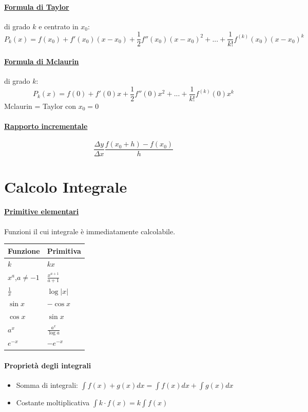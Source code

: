 \documentclass[12pt, a4paper]{article}
\begin{document}
\paragraph*{\underline{Formula di Taylor}} di grado $k$ e centrato in $x_0$:
$$P_k(x)=f(x_0)+f'(x_0)(x-x_0) + \frac{1}{2}f''(x_0)(x-x_0)^2 +... + \frac{1}{k!}f^{(k)}(x_0)(x-x_0)^k$$

\paragraph*{\underline{Formula di Mclaurin}} di grado $k$:
$$P_k(x)=f(0)+f'(0)x+\frac{1}{2}f''(0)x^2+...+\frac{1}{k!}f^{(k)}(0)x^k$$
\small{Mclaurin = Taylor con $x_0=0$}

\paragraph*{\underline{Rapporto incrementale}}
$$\frac{\Delta y}{ \Delta x}\frac{f(x_0+h)-f(x_0)}{h} $$


\section*{Calcolo Integrale}

\begin{multicols}{3}
\paragraph*{\underline{Primitive elementari}}
Funzioni il cui integrale è immediatamente calcolabile.
\columnbreak
\begin{tabularx}{0.7\textwidth}{ |Y|Y| }
	\hline
	\textbf{Funzione} & \textbf{Primitiva}    \\
	\hline
	$k$               & $kx$                  \\
	$x^a$,$a\neq-1$   & $\frac{x^{a+1}}{a+1}$ \\
	$\frac{1}{x}$     & $\log|x|$             \\
	$\sin x$          & $-\cos x$             \\
	$\cos x $         & $\sin x$              \\
	$a^x$             & $\frac{a^x}{\log a}$  \\
	\hline
	$e^{-x}$          & $-e^{-x}$             \\
	\hline
\end{tabularx}
\end{multicols}

\paragraph*{Proprietà degli integrali}
\begin{itemize}
	\item Somma di integrali: $\int f(x)+g(x) dx = \int f(x) dx + \int g(x) dx$
	\item Costante moltiplicativa $\int k \cdot f(x) = k \int f(x)$
\end{itemize}
\end{document}
